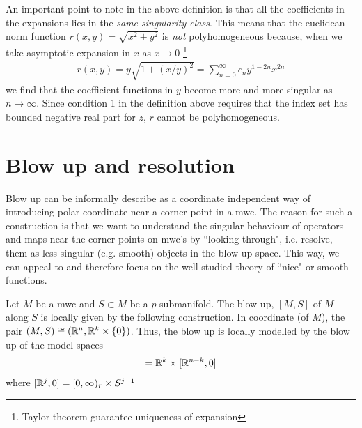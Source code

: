 \documentclass{article}
\begin{document}
An important point to note in the above definition is that all the coefficients in the expansions lies in the \emph{same singularity class}. This means that the euclidean norm function $r(x, y) = \sqrt{x^2 + y^2}$ is \emph{not} polyhomogeneous because, when we take asymptotic expansion in $x$ as $x \to 0$ \footnote{Taylor theorem guarantee uniqueness of expansion}
\begin{align*}
r(x, y) = y \sqrt{1 + (x / y)^2} = \sum_{n = 0}^\infty c_n y^{1 - 2n} x^{2n}
\end{align*}
we find that the coefficient functions in $y$ become more and more singular as $n \to \infty$. Since condition 1 in the definition above requires that the index set has bounded negative real part for $z$, $r$ cannot be polyhomogeneous. 


\pagebreak
\section{Blow up and resolution} 
Blow up can be informally describe as a coordinate independent way of introducing polar coordinate near a corner point in a mwc. The reason for such a construction is that we want to understand the singular behaviour of operators and maps near the corner points on mwc's by ``looking through", i.e. resolve, them as less singular (e.g. smooth) objects in the blow up space. This way, we can appeal to and therefore focus on the well-studied theory of ``nice" or smooth functions. 

\begin{fdefinition}[Blow up] 
Let $M$ be a mwc and $S \subset M$ be a $p$-submanifold. The blow up, $[M, S]$ of $M$ along $S$ is locally given by the following construction. In coordinate (of $M$), the pair $(M, S) \cong ({\mathbb R}^n, {\mathbb R}^k \times \{0\})$. Thus, the blow up is locally modelled by the blow up of the model spaces 
\begin{align*}
[\R^n, \R^k \times \{0\}^{n -k}] = \R^k \times [\R^{n - k}, 0]
\end{align*}
where $ [{\mathbb R}^{j}, 0] = [0, \infty)_r \times S^{j - 1}$
\end{fdefinition}
\end{document}

